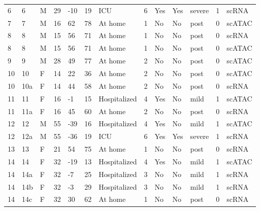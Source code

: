 \documentclass{book}
\begin{document}
\begin{refsection}
\begin{landscape}
\begin{longtable}{p{0.7cm}p{0.7cm}p{0.5cm}p{0.75cm}p{0.75cm}p{0.75cm}p{1.75cm}p{0.8cm}p{0.75cm}p{1cm}p{0.75cm}p{1cm}p{0.75cm}}
    6  & 6   & M & 29 & -10 & 19  & ICU                                                & 6 & Yes & Yes & severe & 1 & scRNA \\
    7  & 7   & M & 16 & 62  & 78  & At home                                            & 1 & No  & No  & post   & 0 & scATAC \\
    8  & 8   & M & 15 & 56  & 71  & At home                                            & 1 & No  & No  & post   & 0 & scRNA \\
    8  & 8   & M & 15 & 56  & 71  & At home                                            & 1 & No  & No  & post   & 0 & scATAC \\
    9  & 9   & M & 28 & 49  & 77  & At home                                            & 2 & No  & No  & post   & 0 & scATAC \\
    10 & 10  & F & 14 & 22  & 36  & At home                                            & 2 & No  & No  & post   & 0 & scATAC \\
    10 & 10a & F & 14 & 44  & 58  & At home                                            & 2 & No  & No  & post   & 0 & scRNA \\
    11 & 11  & F & 16 & -1  & 15  & Hospitalized                                       & 4 & Yes & No  & mild   & 1 & scATAC \\
    11 & 11a & F & 16 & 45  & 60  & At home                                            & 2 & No  & No  & post   & 0 & scRNA \\
    12 & 12  & M & 55 & -39 & 16  & Hospitalized                                       & 4 & Yes & No  & mild   & 1 & scATAC \\
    12 & 12a & M & 55 & -36 & 19  & ICU                                                & 6 & Yes & Yes & severe & 1 & scRNA \\
    13 & 13  & F & 21 & 54  & 75  & At home                                            & 1 & No  & No  & post   & 0 & scRNA \\
    14 & 14  & F & 32 & -19 & 13  & Hospitalized                                       & 4 & Yes & No  & mild   & 1 & scATAC \\
    14 & 14a & F & 32 & -7  & 25  & Hospitalized                                       & 3 & No  & No  & mild   & 1 & scRNA \\
    14 & 14b & F & 32 & -3  & 29  & Hospitalized                                       & 3 & No  & No  & mild   & 1 & scRNA \\
    14 & 14c & F & 32 & 30  & 62  & At home                                            & 1 & No  & No  & post   & 0 & scRNA \\

\end{longtable}
\end{landscape}
\end{refsection}
\end{document}

